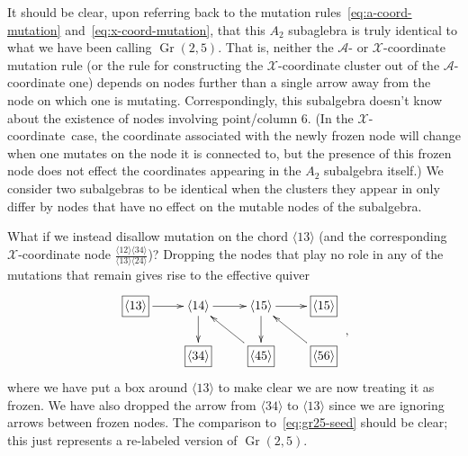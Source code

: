 \documentclass[11pt]{article}
\DeclareMathOperator{\Gr}{Gr}
\def\ket#1{\langle #1 \rangle}
\def\x{\mathcal{X}}
\def\xcoord{$\mathcal{X}$-coordinate}
\def\a{\mathcal{A}}
\begin{document}
It should be clear, upon referring back to the mutation rules~\eqref{eq:a-coord-mutation} and~\eqref{eq:x-coord-mutation}, that this $A_2$ subaglebra is truly identical to what we have been calling $\Gr(2,5)$. That is, neither the $\a$- or $\x$-coordinate mutation rule (or the rule for constructing the $\x$-coordinate cluster out of the $\a$-coordinate one) depends on nodes further than a single arrow away from the node on which one is mutating. Correspondingly, this subalgebra doesn't know about the existence of nodes involving point/column 6. (In the \xcoord\ case, the coordinate associated with the newly frozen node will change when one mutates on the node it is connected to, but the presence of this frozen node does not effect the coordinates appearing in the $A_2$ subalgebra itself.) We consider two subalgebras to be identical when the clusters they appear in only differ by nodes that have no effect on the mutable nodes of the subalgebra.  

What if we instead disallow mutation on the chord $\ket{13}$ (and the corresponding $\x$-coordinate node $\frac{\ket{12}\ket{34}}{\ket{13}\ket{24}}$)? Dropping the nodes that play no role in any of the mutations that remain gives rise to the effective quiver
\begin{equation}\label{eq:gr26-subalgebra-seed}
\begin{gathered}
\begin{xy} 0;<1pt,0pt>:<0pt,-1pt>::
	(25,0) *+{\langle 14\rangle} ="0",
	(75,0) *+{\langle 15\rangle} ="1",
	(125,0) *+{\framebox[5ex]{$\langle 15\rangle$}} ="2",
	(125,40) *+{\framebox[5ex]{$\langle 56\rangle$}} ="3",
	(75,40) *+{\framebox[5ex]{$\langle 45\rangle$}} ="4",
	(25,40) *+{\framebox[5ex]{$\langle 34\rangle$}} ="5",
	(-25,0) *+{\framebox[5ex]{$\langle 13\rangle$}} ="6",
	"0", {\ar"1"},
	"4", {\ar"0"},
	"0", {\ar"5"},
	"6", {\ar"0"},
	"1", {\ar"2"},
	"3", {\ar"1"},
	"1", {\ar"4"},
\end{xy}
\end{gathered} \ ,
\end{equation}
where we have put a box around $\ket{13}$ to make clear we are now treating it as frozen. We have also dropped the arrow from $\ket{34}$ to $\ket{13}$ since we are ignoring arrows between frozen nodes. The comparison to~\eqref{eq:gr25-seed} should be clear; this just represents a re-labeled version of $\Gr(2,5)$. 
\end{document}
